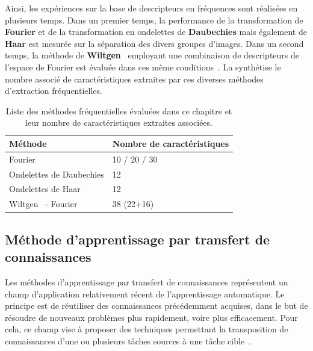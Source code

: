 Ainsi, les expériences sur la base de descripteurs en fréquences sont réalisées en plusieurs temps. Dans un premier temps, la performance de la transformation de \textbf{Fourier} et de la transformation en ondelettes de \textbf{Daubechies} mais également de \textbf{Haar} est mesurée sur la séparation des divers groupes d'images. Dans un second temps, la méthode de \textbf{Wiltgen}~ employant une combinaison de descripteurs de l'espace de Fourier est évaluée dans ces même conditions~\cite{Wiltgen2008}. La  synthétise le nombre associé de caractéristiques extraites par ces diverses méthodes d'extraction fréquentielles.\par

\begin{table}[H]
    \centering
    \begin{tabular}{ll}
        \toprule
        \textbf{Méthode}                        & \textbf{Nombre de caractéristiques}   \\ \hline
        Fourier                                 & 10 / 20 / 30                          \\ \hline
        Ondelettes de Daubechies                & 12                                    \\ \hline
        Ondelettes de Haar                      & 12                                    \\ \hline
        Wiltgen~\cite{Wiltgen2008} - Fourier    & 38 (22+16)                             \\
        \bottomrule
    \end{tabular}
    \caption{Liste des méthodes fréquentielles évaluées dans ce chapitre et leur nombre de caractéristiques extraites associées.}
    \label{tab:number_features_frequency}
\end{table}\par
\clearpage

\subsection{Méthode d'apprentissage par transfert de connaissances}
Les méthodes d'apprentissage par transfert de connaissances représentent un champ d'application relativement récent de l'apprentissage automatique. Le principe est de réutiliser des connaissances précédemment acquises, dans le but de résoudre de nouveaux problèmes plus rapidement, voire plus efficacement. Pour cela, ce champ vise à proposer des techniques permettant la transposition de connaissances d'une ou plusieurs tâches sources à une tâche cible~\cite{Pan2010}.\par

